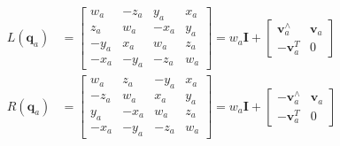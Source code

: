 \begin{equation}
\begin{aligned}
L\left(\bm{q}_a\right)&=\left[\begin{matrix}
  w_a & -z_a &  y_a & x_a\\
  z_a &  w_a & -x_a & y_a\\
 -y_a &  x_a &  w_a & z_a\\
 -x_a & -y_a & -z_a & w_a
\end{matrix}\right]=w_a\bm{I}+\left[\begin{matrix}
\bm{v}_a^\wedge & \bm{v}_a\\
-\bm{v}_a^T & 0
\end{matrix}\right]\\
R\left(\bm{q}_a\right)&=\left[\begin{matrix}
  w_a &  z_a & -y_a & x_a\\
 -z_a &  w_a &  x_a & y_a\\
  y_a & -x_a &  w_a & z_a\\
 -x_a & -y_a & -z_a & w_a
\end{matrix}\right]=w_a\bm{I}+\left[\begin{matrix}
-\bm{v}_a^\wedge & \bm{v}_a\\
-\bm{v}_a^T & 0
\end{matrix}\right]
\end{aligned}
\end{equation}
